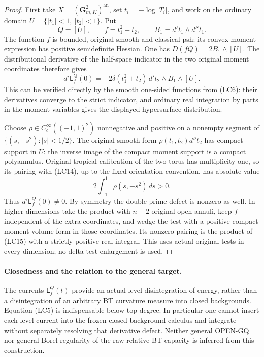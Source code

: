 \begin{proof}
First take $X=(\mathbf G_{m,K}^2)^{\mathrm{an}}$, set
$t_i=-\log|T_i|$, and work on the ordinary domain
$U=\{|t_1|<1,\ |t_2|<1\}$.  Put
\[
 Q=[U],\qquad f=t_1^2+t_2,\qquad
 B_1=d't_1\wedge d''t_1.
 \tag{LC13}
\]
The function $f$ is bounded, original smooth and classical psh:
its convex moment expression has positive semidefinite Hessian.
One has $D(fQ)=2B_1\wedge[U]$.  The distributional derivative of
the half-space indicator in the two original moment coordinates
therefore gives
\[
 d'\mathsf L_f^Q(0)
 =-2\delta(t_1^2+t_2)\,d't_2\wedge B_1\wedge[U].
 \tag{LC14}
\]
This can be verified directly by the smooth one-sided functions
from (LC6): their derivatives converge to the strict indicator,
and ordinary real integration by parts in the moment variables
gives the displayed hypersurface distribution.

Choose $\rho\in C_c^\infty((-1,1)^2)$ nonnegative and positive
on a nonempty segment of $\{(s,-s^2):|s|<1/2\}$.
The original smooth form $\rho(t_1,t_2)d''t_2$ has compact
support in $U$: the inverse image of the compact moment support
is a compact polyannulus.  Original tropical calibration of the
two-torus has multiplicity one, so its pairing with (LC14),
up to the fixed orientation convention, has absolute value
\[
 2\int_{-1}^{1}\rho(s,-s^2)\,ds>0.
 \tag{LC15}
\]
Thus $d'\mathsf L_f^Q(0)\ne0$.  By symmetry the double-prime
defect is nonzero as well.  In higher dimensions take the product
with $n-2$ original open annuli, keep $f$ independent of the extra
coordinates, and wedge the test with a positive compact moment
volume form in those coordinates.  Its nonzero pairing is the
product of (LC15) with a strictly positive real integral.  This
uses actual original tests in every dimension; no delta-test
enlargement is used.
\end{proof}

\paragraph{Closedness and the relation to the general target.}
The currents $\mathsf L^Q_f(t)$ provide an actual level
disintegration of energy, rather than a disintegration of an
arbitrary BT curvature measure into closed backgrounds.
Equation (LC5) is indispensable below top degree.  In particular
one cannot insert each level current into the frozen closed-background
calculus and integrate without separately resolving that derivative
defect.  Neither general OPEN-GQ nor general Borel regularity of
the raw relative BT capacity is inferred from this construction.
